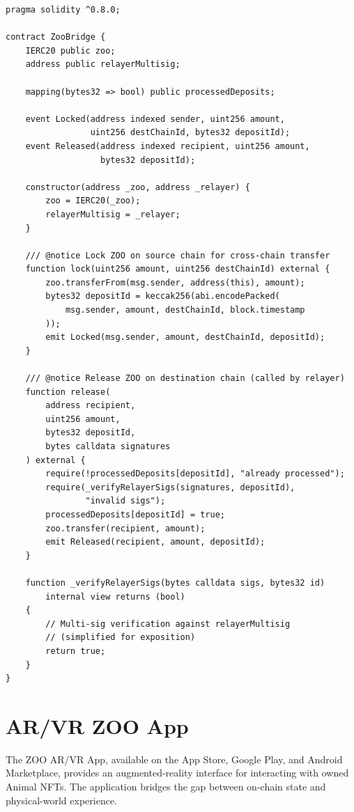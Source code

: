 \documentclass[11pt,letterpaper]{article}
\begin{document}
\begin{lstlisting}[language=Solidity,caption={ZooBridge: cross-chain lock-and-mint}]
pragma solidity ^0.8.0;

contract ZooBridge {
    IERC20 public zoo;
    address public relayerMultisig;

    mapping(bytes32 => bool) public processedDeposits;

    event Locked(address indexed sender, uint256 amount,
                 uint256 destChainId, bytes32 depositId);
    event Released(address indexed recipient, uint256 amount,
                   bytes32 depositId);

    constructor(address _zoo, address _relayer) {
        zoo = IERC20(_zoo);
        relayerMultisig = _relayer;
    }

    /// @notice Lock ZOO on source chain for cross-chain transfer
    function lock(uint256 amount, uint256 destChainId) external {
        zoo.transferFrom(msg.sender, address(this), amount);
        bytes32 depositId = keccak256(abi.encodePacked(
            msg.sender, amount, destChainId, block.timestamp
        ));
        emit Locked(msg.sender, amount, destChainId, depositId);
    }

    /// @notice Release ZOO on destination chain (called by relayer)
    function release(
        address recipient,
        uint256 amount,
        bytes32 depositId,
        bytes calldata signatures
    ) external {
        require(!processedDeposits[depositId], "already processed");
        require(_verifyRelayerSigs(signatures, depositId),
                "invalid sigs");
        processedDeposits[depositId] = true;
        zoo.transfer(recipient, amount);
        emit Released(recipient, amount, depositId);
    }

    function _verifyRelayerSigs(bytes calldata sigs, bytes32 id)
        internal view returns (bool)
    {
        // Multi-sig verification against relayerMultisig
        // (simplified for exposition)
        return true;
    }
}
\end{lstlisting}

\section{AR/VR ZOO App}
\label{sec:ar}

The ZOO AR/VR App, available on the App Store, Google Play, and Android Marketplace,
provides an augmented-reality interface for interacting with owned Animal NFTs.  The
application bridges the gap between on-chain state and physical-world experience.
\end{document}
